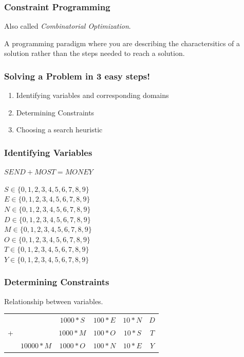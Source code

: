 \begin{frame}
	\frametitle{Constraint Programming}
	Also called \textit{Combinatorial Optimization}.

	\vspace{1cm}

	A programming paradigm where you are describing the charactersitics of a solution
	rather than the steps needed to reach a solution.
\end{frame}

\begin{frame}
	\frametitle{Solving a Problem in 3 easy steps!}

	\begin{enumerate}
		\item Identifying variables and corresponding domains
		\item Determining Constraints
		\item Choosing a search heuristic
	\end{enumerate}
\end{frame}

\begin{frame}
	\frametitle{Identifying Variables}
	$SEND + MOST = MONEY$
	
	\vspace{0.5cm}
	\noindent
	$S \in \{0, 1, 2, 3, 4, 5, 6, 7, 8, 9\}$ \\
	$E \in \{0, 1, 2, 3, 4, 5, 6, 7, 8, 9\}$ \\
	$N \in \{0, 1, 2, 3, 4, 5, 6, 7, 8, 9\}$ \\
	$D \in \{0, 1, 2, 3, 4, 5, 6, 7, 8, 9\}$ \\
	$M \in \{0, 1, 2, 3, 4, 5, 6, 7, 8, 9\}$ \\
	$O \in \{0, 1, 2, 3, 4, 5, 6, 7, 8, 9\}$ \\
	$T \in \{0, 1, 2, 3, 4, 5, 6, 7, 8, 9\}$ \\
	$Y \in \{0, 1, 2, 3, 4, 5, 6, 7, 8, 9\}$
\end{frame}

\begin{frame}
	\frametitle{Determining Constraints}
	Relationship between variables.

	\begin{tabular}{cccccc}
		& & $1000 * S$ & $100 * E$ & $10 * N$ & $D$ \\
		+ &	& $1000 * M$ & $100 * O$ & $10 * S$ & $T$ \\
		\hline
		& $10000 * M$ & $1000 * O$ & $100 * N$ & $10 * E$ & $Y$
	\end{tabular}

\end{frame}

